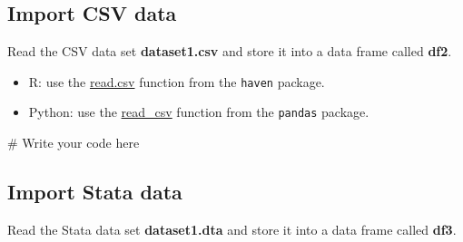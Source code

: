 \documentclass[
  letterpaper,
  DIV=11,
  numbers=noendperiod]{scrartcl}
\newenvironment{Shaded}{\begin{snugshade}}{\end{snugshade}}
\newcommand{\CommentTok}[1]{\textcolor[rgb]{0.37,0.37,0.37}{#1}}
\providecommand{\tightlist}{%
  \setlength{\itemsep}{0pt}\setlength{\parskip}{0pt}}\usepackage{longtable,booktabs,array}
\begin{document}
\hypertarget{import-csv-data}{%
\subsection{Import CSV data}\label{import-csv-data}}

Read the CSV data set \textbf{dataset1.csv} and store it into a data
frame called \textbf{df2}.

\begin{tcolorbox}[enhanced jigsaw, arc=.35mm, coltitle=black, toprule=.15mm, bottomtitle=1mm, colbacktitle=quarto-callout-tip-color!10!white, bottomrule=.15mm, titlerule=0mm, rightrule=.15mm, colframe=quarto-callout-tip-color-frame, title=\textcolor{quarto-callout-tip-color}{\faLightbulb}\hspace{0.5em}{Tip}, breakable, opacityback=0, opacitybacktitle=0.6, toptitle=1mm, leftrule=.75mm, colback=white, left=2mm]

\begin{itemize}
\tightlist
\item
  R: use the
  \href{https://www.rdocumentation.org/packages/utils/versions/3.6.2/topics/read.table}{read.csv}
  function from the \texttt{haven} package.
\item
  Python: use the
  \href{https://pandas.pydata.org/docs/reference/api/pandas.read_csv.html}{read\_csv}
  function from the \texttt{pandas} package.
\end{itemize}

\end{tcolorbox}

\begin{Shaded}
\begin{Highlighting}[]
\CommentTok{\# Write your code here}
\end{Highlighting}
\end{Shaded}

\hypertarget{import-stata-data}{%
\subsection{Import Stata data}\label{import-stata-data}}

Read the Stata data set \textbf{dataset1.dta} and store it into a data
frame called \textbf{df3}.
\end{document}
